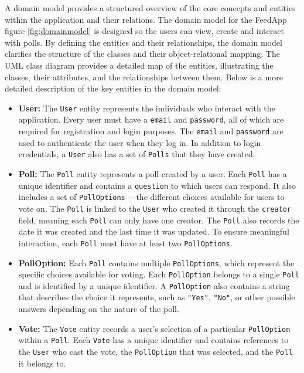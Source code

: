 A domain model provides a structured overview of the core concepts and entities within the application and their relations.  The domain model for the FeedApp figure \ref{fig:domainmodel} is designed so the users can view, create and interact with polls. By defining the entities and their relationships, the domain model clarifies the structure of the classes and their object-relational mapping. The UML class diagram provides a detailed map of the entities, illustrating the classes, their attributes, and the relationships between them. Below is a more detailed description of the key entities in the domain model: 

\begin{itemize}
    \item \textbf{User:} The \texttt{User} entity represents the individuals who interact with the application. Every user must have a \texttt{email} and \texttt{password}, all of which are required for registration and login purposes. The \texttt{email} and \texttt{password} are used to authenticate the user when they log in. In addition to login credentials, a \texttt{User} also has a set of \texttt{Polls} that they have created.

    \item \textbf{Poll:} The \texttt{Poll} entity represents a poll created by a user. Each \texttt{Poll} has a unique identifier and contains a \texttt{question} to which users can respond. It also includes a set of \texttt{PollOptions} —the different choices available for users to vote on. The \texttt{Poll} is linked to the \texttt{User} who created it through the \texttt{creator} field, meaning each \texttt{Poll} can only have one creator. The \texttt{Poll} also records the date it was created and the last time it was updated. To ensure meaningful interaction, each \texttt{Poll} must have at least two \texttt{PollOptions}.

    \item \textbf{PollOption:} Each \texttt{Poll} contains multiple \texttt{PollOptions}, which represent the specific choices available for voting. Each \texttt{PollOption} belongs to a single \texttt{Poll} and is identified by a unique identifier. A \texttt{PollOption} also contains a string that describes the choice it represents, such as \texttt{"Yes"}, \texttt{"No"}, or other possible answers depending on the nature of the poll. 

    \item \textbf{Vote:} The \texttt{Vote} entity records a user’s selection of a particular \texttt{PollOption} within a \texttt{Poll}. Each \texttt{Vote} has a unique identifier and contains references to the \texttt{User} who cast the vote, the \texttt{PollOption} that was selected, and the \texttt{Poll} it belongs to.
\end{itemize}


